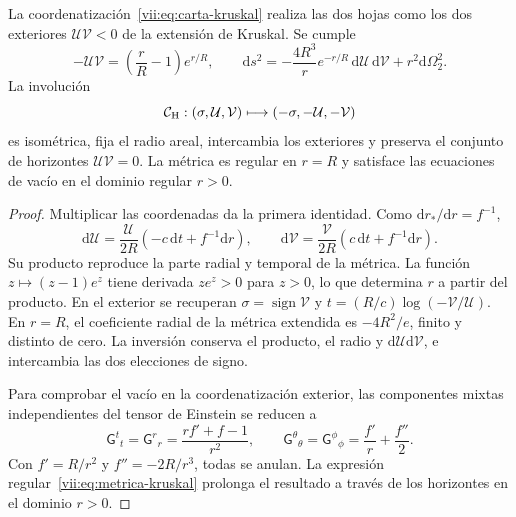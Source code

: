 \begin{theorem}
\label{vii:thm:kruskal-hojas}
La coordenatización~\eqref{vii:eq:carta-kruskal} realiza las dos hojas como los
dos exteriores \(\mathcal U\mathcal V<0\) de la extensión de
Kruskal. Se cumple
\begin{equation}
 -\mathcal U\mathcal V=\left(\frac rR-1\right)e^{r/R},\qquad
 \mathrm ds^2=-\frac{4R^3}{r}e^{-r/R}\,
                    \mathrm d\mathcal U\,\mathrm d\mathcal V
                    +r^2\mathrm d\Omega_2^2.
 \label{vii:eq:metrica-kruskal}
\end{equation}
La involución
\begin{equation}
 \mathcal C_{\rm H}:(\sigma,\mathcal U,\mathcal V)
 \longmapsto(-\sigma,-\mathcal U,-\mathcal V)
 \label{vii:eq:involucion-horizonte}
\end{equation}
es isométrica, fija el radio areal, intercambia los exteriores y preserva
el conjunto de horizontes \(\mathcal U\mathcal V=0\).
La métrica es regular en \(r=R\) y satisface las ecuaciones de vacío
en el dominio regular \(r>0\).
\end{theorem}
\begin{proof}
Multiplicar las coordenadas da la primera identidad. Como
\(\mathrm dr_*/\mathrm dr=f^{-1}\),
\[
 \mathrm d\mathcal U=\frac{\mathcal U}{2R}
            (-c\,\mathrm dt+f^{-1}\mathrm dr),\qquad
 \mathrm d\mathcal V=\frac{\mathcal V}{2R}
            ( c\,\mathrm dt+f^{-1}\mathrm dr).
\]
Su producto reproduce la parte radial y temporal de la métrica.
La función \(z\mapsto(z-1)e^z\) tiene derivada \(ze^z>0\)
para \(z>0\), lo que determina \(r\) a partir del producto.
En el exterior se recuperan
\(\sigma=\operatorname{sign}\mathcal V\) y
\(t=(R/c)\log(-\mathcal V/\mathcal U)\).
En \(r=R\), el coeficiente radial de la métrica extendida es
\(-4R^2/e\), finito y distinto de cero. La inversión conserva el
producto, el radio y \(\mathrm d\mathcal U\mathrm d\mathcal V\),
e intercambia las dos elecciones de signo.

Para comprobar el vacío en la coordenatización exterior, las componentes mixtas
independientes del tensor de Einstein se reducen a
\[
 \mathsf G^t{}_t=\mathsf G^r{}_r
 =\frac{rf'+f-1}{r^2},\qquad
 \mathsf G^\theta{}_\theta=\mathsf G^\phi{}_\phi
 =\frac{f'}r+\frac{f''}2.
\]
Con \(f'=R/r^2\) y \(f''=-2R/r^3\), todas se anulan.
La expresión regular~\eqref{vii:eq:metrica-kruskal} prolonga el
resultado a través de los horizontes en el dominio \(r>0\).
\end{proof}

